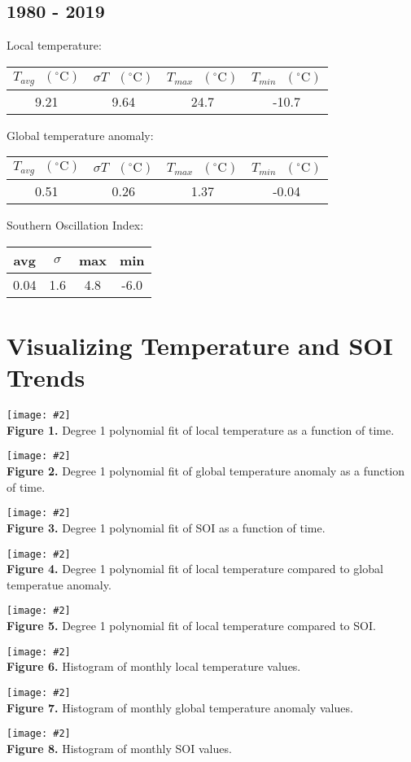 \documentclass[12pt]{article}
\newcommand{\img}[4]{
 \begin{center}
 \texttt{[image: \#2]} \\
 \textbf{Figure #3.} #4
 \end{center}
}
\begin{document}
\subsection*{1980 - 2019}
Local temperature:
\begin{center}
\begin{tabular}{c | c | c | c}
 $T_{avg} \textrm{ } (^{\circ} \textrm{C})$ &
 $\sigma T \textrm{ } (^{\circ} \textrm{C})$ &
 $T_{max} \textrm{ } (^{\circ} \textrm{C})$ &
 $T_{min} \textrm{ } (^{\circ} \textrm{C})$ \\ %
 \hline
 9.21 & 9.64 & 24.7 & -10.7 \\ %
\end{tabular}
\end{center}
Global temperature anomaly:
\begin{center}
\begin{tabular}{c | c | c | c}
 $T_{avg} \textrm{ } (^{\circ} \textrm{C})$ &
 $\sigma T \textrm{ } (^{\circ} \textrm{C})$ &
 $T_{max} \textrm{ } (^{\circ} \textrm{C})$ &
 $T_{min} \textrm{ } (^{\circ} \textrm{C})$ \\ %
 \hline
 0.51 & 0.26 & 1.37 & -0.04 \\ %
\end{tabular}
\end{center}
Southern Oscillation Index:
\begin{center}
\begin{tabular}{c | c | c | c}
 avg & $\sigma$ & max & min \\ %
 \hline
 0.04 & 1.6 & 4.8 & -6.0 \\ %
\end{tabular}
\end{center}

\section*{Visualizing Temperature and SOI Trends}
\img{0.65}{../plots/fits/local.png}{1}{
 Degree 1 polynomial fit of local temperature as a
 function of time.
}
\img{0.65}{../plots/fits/global.png}{2}{
 Degree 1 polynomial fit of global temperature anomaly as a
 function of time.
}
\img{0.65}{../plots/fits/soi.png}{3}{
 Degree 1 polynomial fit of SOI as a
 function of time.
}
\img{0.65}{../plots/compare/local_vs_global.png}{4}{
 Degree 1 polynomial fit of local temperature compared
 to global temperatue anomaly.
}
\img{0.65}{../plots/compare/local_vs_soi.png}{5}{
 Degree 1 polynomial fit of local temperature compared
 to SOI.
}
\img{0.65}{../plots/histogram/local.png}{6}{
 Histogram of monthly local temperature values.
}
\img{0.65}{../plots/histogram/global.png}{7}{
 Histogram of monthly global temperature anomaly values.
}
\img{0.65}{../plots/histogram/soi.png}{8}{
 Histogram of monthly SOI values.
}
\end{document}
